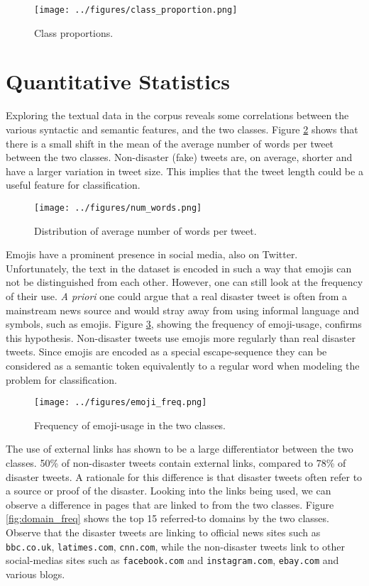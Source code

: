 \documentclass[journal, ]{IEEEtran}
\let\MYoriglatexcaption\caption
\renewcommand{\caption}[2][\relax]{\MYoriglatexcaption[#2]{#2}}
\begin{document}
\begin{figure}[hbt!]
  \centering
  \texttt{[image: ../figures/class\_proportion.png]}
  \caption{Class proportions.}
  \label{fig:class_proportions}
\end{figure}

\section{Quantitative Statistics}
Exploring the textual data in the corpus reveals some correlations between the
various syntactic and semantic features, and the two classes. Figure
\ref{fig:num_words} shows that there is a small shift in the mean of the
average number of words per tweet between the two classes. Non-disaster (fake)
tweets are, on average, shorter and have a larger variation in tweet size. This
implies that the tweet length could be a useful feature for classification.\\

\begin{figure}[hbt!]
  \centering
  \texttt{[image: ../figures/num\_words.png]}
  \caption{Distribution of average number of words per tweet.}
  \label{fig:num_words}
\end{figure}

Emojis have a prominent presence in social media, also on Twitter.
Unfortunately, the text in the dataset is encoded in such a way that emojis can
not be distinguished from each other. However, one can still look at the
frequency of their use. \textit{A priori} one could argue that a real disaster tweet
is often from a mainstream news source and would stray away from using informal
language and symbols, such as emojis. Figure \ref{fig:emoji_freq}, showing the
frequency of emoji-usage, confirms this hypothesis. Non-disaster tweets use
emojis more regularly than real disaster tweets. Since emojis are encoded as a
special escape-sequence they can be considered as a semantic token equivalently
to a regular word when modeling the problem for classification.

\begin{figure}[hbt!]
  \centering
  \texttt{[image: ../figures/emoji\_freq.png]}
  \caption{Frequency of emoji-usage in the two classes.}
  \label{fig:emoji_freq}
\end{figure}

The use of external links has shown to be a large differentiator between the
two classes. 50\% of non-disaster tweets contain external links, compared to
78\% of disaster tweets. A rationale for this difference is that disaster
tweets often refer to a source or proof of the disaster. Looking into the links
being used, we can observe a difference in pages that are linked to from the
two classes. Figure \ref{fig:domain_freq} shows the top 15 referred-to domains
by the two classes. Observe that the disaster tweets are linking to official
news sites such as \texttt{bbc.co.uk}, \texttt{latimes.com}, \texttt{cnn.com},
while the non-disaster tweets link to other social-medias sites such as
\texttt{facebook.com} and \texttt{instagram.com}, \texttt{ebay.com} and various
blogs. 
\end{document}
